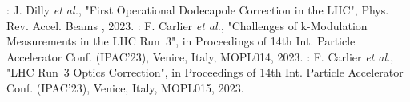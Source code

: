 \begin{declaration}
\newline \newline
\noindent{}: J. Dilly \textit{et al.}, "First Operational Dodecapole Correction in the LHC", Phys. Rev. Accel. Beams , \num{2023}.
\newline \newline
\noindent\cite{IPAC:Carlier:Challenges_kmodulation_LHC_Run3}: F. Carlier \textit{et al.}, "Challenges of k-Modulation Measurements in the LHC Run~3", in Proceedings of \num{14}th Int. Particle Accelerator Conf. (IPAC'23), Venice, Italy,  MOPL014, \num{2023}.
\newline \newline
\noindent\cite{IPAC:Carlier:LHC_Run3_Optics_Correction}: F. Carlier \textit{et al.}, "LHC Run~3 Optics Correction", in Proceedings of \num{14}th Int. Particle Accelerator Conf. (IPAC'23), Venice, Italy,  MOPL015, \num{2023}.
\newline \newline
{}
\end{declaration}

\cleardoublepage